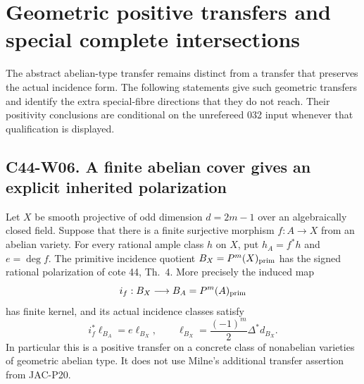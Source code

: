 \section{Geometric positive transfers and special complete intersections}

The abstract abelian-type transfer remains distinct from a transfer that
preserves the actual incidence form. The following statements give
such geometric transfers and identify the extra special-fibre directions
that they do not reach. Their positivity conclusions are conditional
on the unrefereed 032 input whenever that qualification is displayed.

\subsection*{C44-W06. A finite abelian cover gives an explicit inherited polarization}

\begin{theorem}
Let $X$ be smooth projective of odd dimension $d=2m-1$ over an
algebraically closed field. Suppose that there is a finite surjective
morphism $f:A\to X$ from an abelian variety. For every rational ample
class $h$ on $X$, put $h_A=f^*h$ and $e=\deg f$. The primitive
incidence quotient $B_X=P^m(X)_{\rm prim}$ has the signed rational
polarization of cote 44, Th.~4. More precisely the induced map
\[
 i_f:B_X\longrightarrow B_A=P^m(A)_{\rm prim}
\]
has finite kernel, and its actual incidence classes satisfy
\begin{equation}\label{c44:finite-cover-polarization}
 i_f^*\ell_{B_A}=e\ell_{B_X},\qquad
 \ell_{B_X}=\frac{(-1)^m}{2}\Delta^*d_{B_X}.
\end{equation}
In particular this is a positive transfer on a concrete class of
nonabelian varieties of geometric abelian type. It does not use
Milne's additional transfer assertion from JAC-P20.
\end{theorem}

